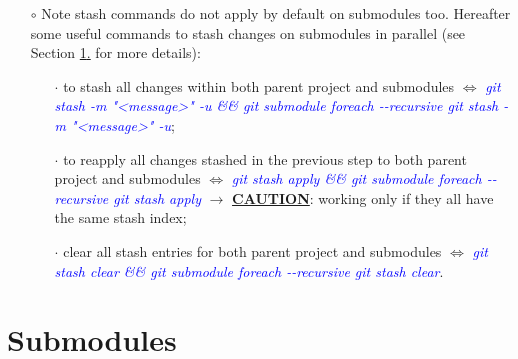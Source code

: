 \documentclass[a4paper,portrait,10pt]{article}   %
\newcommand{\mybulletlvA}{$\circ$}   %
\newcommand{\mybulletlvB}{$\cdot$}   %
\newcommand{\mydiv}{$\Leftrightarrow$ }   %
\newcommand{\mycmd}[1]{\textcolor{blue}{\textit{#1}}}   %
\newcommand{\mysecvspace}{\vspace{6mm}}   %
\newcommand{\mysecref}[1]{\hyperref[#1]{\ref{#1}.}}   %
\begin{document}
\begin{itemize}
\item[\mybulletlvA] Note stash commands do not apply by default on submodules too. Hereafter some useful commands to stash changes on submodules in parallel (see Section \mysecref{sec:Submodules} for more details):
\begin{itemize}
  \item[\mybulletlvB] to stash all changes within both parent project and submodules \mydiv \mycmd{git stash -m "<message>" -u \&\& git submodule foreach -{}-recursive git stash -m "<message>" -u};
  \item[\mybulletlvB] to reapply all changes stashed in the previous step to both parent project and submodules \mydiv \mycmd{git stash apply \&\& git submodule foreach -{}-recursive git stash apply} $\rightarrow$ \textbf{\underline{CAUTION}}: working only if they all have the same stash index;
  \item[\mybulletlvB] clear all stash entries for both parent project and submodules \mydiv \mycmd{git stash clear \&\& git submodule foreach -{}-recursive git stash clear}.
\end{itemize}
\end{itemize}
\mysecvspace


\section{Submodules}   \label{sec:Submodules}
\end{document}
